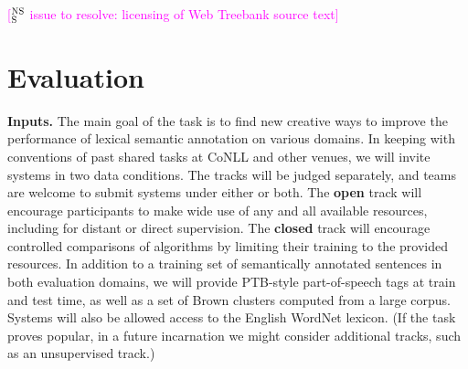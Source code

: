 \documentclass[11pt]{article}
\newcommand{\citeposs}[1]{\citeauthor{#1}'s (\citeyear{#1})}
\newcommand{\ensuretext}[1]{#1}
\newcommand{\nssmarker}{\ensuretext{\textcolor{magenta}{\ensuremath{^{\textsc{NS}}_{\textsc{S}}}}}}
\newcommand{\arkcomment}[3]{\ensuretext{\textcolor{#3}{[#1 #2]}}}
\newcommand{\nss}[1]{\arkcomment{\nssmarker}{#1}{magenta}}
\newcommand{\longversion}[1]{} %
\begin{document}
\nss{issue to resolve: licensing of Web Treebank source text}

\section{Evaluation}
\longversion{
\subsection{System Submission Process}

On May~5,~2015, teams will be furnished with the test data (minus the gold labels). 
They will have until May~10 to submit up to 3~system predictions for evaluation. 
The test data will include sentences from both evaluation domains, 
in a random order: to encourage robust systems, 
the domain of each sentence will not be marked at test time, 
and the proportion of sentences from each domain is not guaranteed to be 
the same in the trial, train, dev, and test sets.\nss{is this crazy?}

\subsection{Splits}

We adopt \citeposs{schneider-14} splits of the \textsc{Reviews} data: 
101~documents (500~sentences, 7,171~words) are held out as a test set, 
leaving 3,312~sentences\slash 48,408~words for training\slash development.

For \textsc{Tweets}, 
we follow \citeposs{johannsen-14} splits: 
\nss{sizes of splits}.
The data from Ritter is used as follows: 551 tweets (10,652 tokens) serve as training data, 118 (2242 tokens) as dev and another 118 (2291 tokens) as test set. Additionally, there is a second test set, drawn from a different sample of 200 tweets (3064 tokens).
}

\textbf{Inputs.}
The main goal of the task is to find new creative ways to improve the performance of lexical semantic annotation on various domains. 
In keeping with conventions of past shared tasks at CoNLL and other venues, 
we will invite systems in two data conditions.
The tracks will be judged separately, and teams are welcome to submit systems under either or both.
The \textbf{open} track will encourage participants to make 
wide use of any and all available resources, including for 
distant or direct supervision. 
The \textbf{closed} track will encourage controlled comparisons of algorithms 
by limiting their training to the provided resources. 
In addition to a training set of semantically annotated sentences in both evaluation domains, 
we will provide PTB-style part-of-speech tags at train and test time, 
as well as a set of Brown clusters \citep{brown-92} computed from a large corpus.
Systems will also be allowed access to the English WordNet lexicon.
(If the task proves popular, in a future incarnation we might consider additional tracks, 
such as an unsupervised track.)
\end{document}
